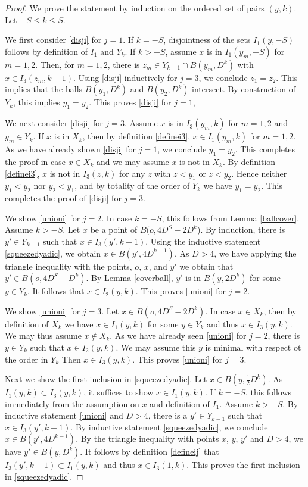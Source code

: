 \begin{proof}
We prove the statement by induction on the ordered set of pairs $(y,k)$.
Let $-S\le k\le S$.

We first consider \eqref{disji} for $j=1$.
If $k=-S$, disjointness of the sets $I_1(y,-S)$ follows by definition of $I_1$ and $Y_k$. If $k>-S$,
assume $x$ is in $I_1(y_m,-S)$ for $m=1,2$.
Then, for $m=1,2$, there is $z_m\in Y_{k-1}\cap B(y_m,D^k)$ with $x\in I_3(z_m,k-1)$.
Using \eqref{disji} inductively for $j=3$, we
conclude $z_1=z_2$. This implies that the balls
$B(y_1, D^k)$ and $B(y_2, D^k)$ intersect. By construction of $Y_k$, this implies $y_1=y_2$.
This proves \eqref{disji} for $j=1$,

We next consider \eqref{disji} for $j=3$.
Assume $x$ is in $I_3(y_m,k)$ for $m=1,2$ and $y_m\in Y_k$. If $x$ is in $X_k$, then by definition
\eqref{definei3}, $x\in I_1(y_m,k)$ for $m=1,2$.
As we have already shown \eqref{disji} for $j=1$,
we conclude $y_1=y_2$. This completes the proof in
case $x\in X_k$ and we may assume $x$ is not in $X_k$. By definition \eqref{definei3}, $x$ is not
in $I_3(z,k)$  for any $z$ with $z<y_1$ or $z<y_2$.
Hence neither $y_1<y_2$ nor $y_2<y_1$, and by totality
of the order of $Y_k$ we have $y_1=y_2$. This completes the proof of \eqref{disji} for $j=3$.

We  show \eqref{unioni}  for $j=2$.
In case $k=-S$, this follows from Lemma \ref{ballcover}.
Assume  $k>-S$. Let $x$ be a point of $B(o, 4D^S-2D^k$).
By induction, there is $y'\in Y_{k-1}$ such that
$x\in I_3(y',k-1)$. Using the inductive statement
\eqref{squeezedyadic}, we obtain $x\in B(y',4D^{k-1})$.
As $D>4$, we have applying the triangle inequality with
the points, $o$, $x$, and $y'$ we obtain that  $y'\in B(o, 4D^S-D^k)$.
By Lemma \ref{coverball}, $y'$ is in $B(y,2D^k)$
for some $y\in Y_k$. It follows that  $x\in I_2(y,k)$.
This proves \eqref{unioni}  for $j=2$.

We  show \eqref{unioni} for $j=3$.
Let $x\in  B(o, 4D^S-2D^k)$. In case $x\in X_k$,
 then by definition of $X_k$ we have $x\in I_1(y,k)$ for some $y\in Y_k$ and thus $x\in I_3(y,k)$. We may thus assume $x\not\in X_k$. As we have already seen
\eqref{unioni} for $j=2$,
 there is $y\in Y_k$ such that $x\in I_2(y,k)$.
We may assume this $y$ is minimal with respect ot the order in $Y_k$
Then $x\in I_3(y,k)$.
 This proves \eqref{unioni}  for $j=3$.

Next we  show the first inclusion in \eqref{squeezedyadic}.
Let $x\in B(y,\frac 1{2}D^k)$.
As $I_1(y,k)\subset I_3(y,k)$,
it suffices to show $x\in I_1(y,k)$.
If $k=-S$, this follows immediately from
the assumption on $x$ and definition of $I_1$.
Assume $k>-S$. By inductive statement \eqref{unioni}
and $D>4$, there is a
$y'\in Y_{k-1}$ such that $x\in I_3(y',k-1)$.
By inductive statement \eqref{squeezedyadic},
we conclude $x\in B(y',4D^{k-1})$.
By the triangle inequality with points $x$, $y$, $y'$ and $D>4$, we have
$y'\in B(y,D^k)$. It follows by definition
\eqref{defineij} that
$I_3(y',k-1)\subset I_1(y,k)$ and thus
$x\in I_3(1,k)$. This proves the first inclusion
in \eqref{squeezedyadic}.



\end{proof}
